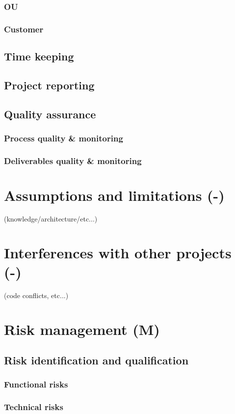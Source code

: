 \documentclass[a4paper,12pt,abstracton,titlepage]{scrartcl}
\begin{document}
\subsubsection{OU}
\subsubsection{Customer}
\subsection{Time keeping}
\subsection{Project reporting}
\subsection{Quality assurance}
\subsubsection{Process quality \& monitoring}
\subsubsection{Deliverables quality \& monitoring}

\section{Assumptions and limitations (-)}
(knowledge/architecture/etc...)

\section{Interferences with other projects (-)}
(code conflicts, etc...)

\section{Risk management (M)}
\subsection{Risk identification and qualification}
\subsubsection{Functional risks}
\subsubsection{Technical risks}
\end{document}
